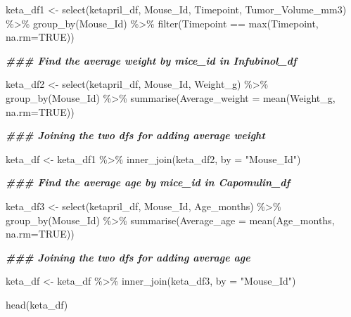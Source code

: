 \documentclass[
]{article}
\newenvironment{Shaded}{\begin{snugshade}}{\end{snugshade}}
\newcommand{\AttributeTok}[1]{\textcolor[rgb]{0.77,0.63,0.00}{#1}}
\newcommand{\ConstantTok}[1]{\textcolor[rgb]{0.00,0.00,0.00}{#1}}
\newcommand{\DocumentationTok}[1]{\textcolor[rgb]{0.56,0.35,0.01}{\textbf{\textit{#1}}}}
\newcommand{\FunctionTok}[1]{\textcolor[rgb]{0.00,0.00,0.00}{#1}}
\newcommand{\NormalTok}[1]{#1}
\newcommand{\OtherTok}[1]{\textcolor[rgb]{0.56,0.35,0.01}{#1}}
\newcommand{\SpecialCharTok}[1]{\textcolor[rgb]{0.00,0.00,0.00}{#1}}
\newcommand{\StringTok}[1]{\textcolor[rgb]{0.31,0.60,0.02}{#1}}
\begin{document}
\begin{Shaded}
\begin{Highlighting}[]
\NormalTok{keta\_df1 }\OtherTok{\textless{}{-}} \FunctionTok{select}\NormalTok{(ketapril\_df, Mouse\_Id, Timepoint, Tumor\_Volume\_mm3) }\SpecialCharTok{\%\textgreater{}\%}
  \FunctionTok{group\_by}\NormalTok{(Mouse\_Id) }\SpecialCharTok{\%\textgreater{}\%}
  \FunctionTok{filter}\NormalTok{(Timepoint }\SpecialCharTok{==} \FunctionTok{max}\NormalTok{(Timepoint, }\AttributeTok{na.rm=}\ConstantTok{TRUE}\NormalTok{))}

\DocumentationTok{\#\#\# Find the average weight by mice\_id in Infubinol\_df}


\NormalTok{keta\_df2 }\OtherTok{\textless{}{-}} \FunctionTok{select}\NormalTok{(ketapril\_df, Mouse\_Id, Weight\_g) }\SpecialCharTok{\%\textgreater{}\%}
  \FunctionTok{group\_by}\NormalTok{(Mouse\_Id) }\SpecialCharTok{\%\textgreater{}\%}
 \FunctionTok{summarise}\NormalTok{(}\AttributeTok{Average\_weight =} \FunctionTok{mean}\NormalTok{(Weight\_g, }\AttributeTok{na.rm=}\ConstantTok{TRUE}\NormalTok{))}

\DocumentationTok{\#\#\# Joining the two df\textquotesingle{}s for adding average weight}

\NormalTok{keta\_df }\OtherTok{\textless{}{-}}\NormalTok{ keta\_df1 }\SpecialCharTok{\%\textgreater{}\%} \FunctionTok{inner\_join}\NormalTok{(keta\_df2, }\AttributeTok{by =} \StringTok{"Mouse\_Id"}\NormalTok{)}

\DocumentationTok{\#\#\# Find the average age by mice\_id in Capomulin\_df}

\NormalTok{keta\_df3 }\OtherTok{\textless{}{-}} \FunctionTok{select}\NormalTok{(ketapril\_df, Mouse\_Id, Age\_months) }\SpecialCharTok{\%\textgreater{}\%}
  \FunctionTok{group\_by}\NormalTok{(Mouse\_Id) }\SpecialCharTok{\%\textgreater{}\%}
 \FunctionTok{summarise}\NormalTok{(}\AttributeTok{Average\_age =} \FunctionTok{mean}\NormalTok{(Age\_months, }\AttributeTok{na.rm=}\ConstantTok{TRUE}\NormalTok{))}

\DocumentationTok{\#\#\# Joining the two df\textquotesingle{}s for adding average age}

\NormalTok{keta\_df }\OtherTok{\textless{}{-}}\NormalTok{ keta\_df }\SpecialCharTok{\%\textgreater{}\%} \FunctionTok{inner\_join}\NormalTok{(keta\_df3, }\AttributeTok{by =} \StringTok{"Mouse\_Id"}\NormalTok{)}

\FunctionTok{head}\NormalTok{(keta\_df)}
\end{Highlighting}
\end{Shaded}
\end{document}
